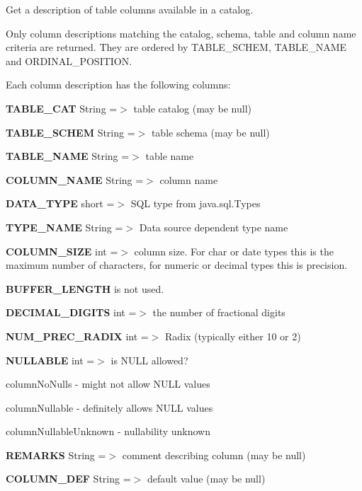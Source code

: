 Get a description of table columns available in a catalog. 

Only column descriptions matching the catalog, schema, table and column name criteria are returned. They are ordered by T\+A\+B\+L\+E\+\_\+\+S\+C\+H\+EM, T\+A\+B\+L\+E\+\_\+\+N\+A\+ME and O\+R\+D\+I\+N\+A\+L\+\_\+\+P\+O\+S\+I\+T\+I\+ON. 

Each column description has the following columns\+: 
\begin{DoxyEnumerate}
\item {\bfseries T\+A\+B\+L\+E\+\_\+\+C\+AT} String =$>$ table catalog (may be null) 
\item {\bfseries T\+A\+B\+L\+E\+\_\+\+S\+C\+H\+EM} String =$>$ table schema (may be null) 
\item {\bfseries T\+A\+B\+L\+E\+\_\+\+N\+A\+ME} String =$>$ table name 
\item {\bfseries C\+O\+L\+U\+M\+N\+\_\+\+N\+A\+ME} String =$>$ column name 
\item {\bfseries D\+A\+T\+A\+\_\+\+T\+Y\+PE} short =$>$ S\+QL type from java.\+sql.\+Types 
\item {\bfseries T\+Y\+P\+E\+\_\+\+N\+A\+ME} String =$>$ Data source dependent type name 
\item {\bfseries C\+O\+L\+U\+M\+N\+\_\+\+S\+I\+ZE} int =$>$ column size. For char or date types this is the maximum number of characters, for numeric or decimal types this is precision. 
\item {\bfseries B\+U\+F\+F\+E\+R\+\_\+\+L\+E\+N\+G\+TH} is not used. 
\item {\bfseries D\+E\+C\+I\+M\+A\+L\+\_\+\+D\+I\+G\+I\+TS} int =$>$ the number of fractional digits 
\item {\bfseries N\+U\+M\+\_\+\+P\+R\+E\+C\+\_\+\+R\+A\+D\+IX} int =$>$ Radix (typically either 10 or 2) 
\item {\bfseries N\+U\+L\+L\+A\+B\+LE} int =$>$ is N\+U\+LL allowed? 
\begin{DoxyItemize}
\item column\+No\+Nulls -\/ might not allow N\+U\+LL values 
\item column\+Nullable -\/ definitely allows N\+U\+LL values 
\item column\+Nullable\+Unknown -\/ nullability unknown 
\end{DoxyItemize}
\item {\bfseries R\+E\+M\+A\+R\+KS} String =$>$ comment describing column (may be null) 
\item {\bfseries C\+O\+L\+U\+M\+N\+\_\+\+D\+EF} String =$>$ default value (may be null) 

\end{DoxyEnumerate}
